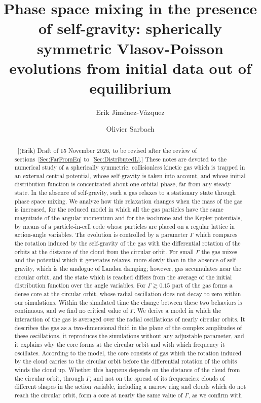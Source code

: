 \documentclass[prd,aps,showpacs,nofootinbib,superscriptaddress,amsmath,amssymb]{revtex4}
\newcommand{\EJ}[1]{{\color{red}~\textsf{[(Erik) #1]}}}
\begin{document}


\title{Phase space mixing in the presence of self-gravity: spherically symmetric Vlasov-Poisson evolutions from initial data out of equilibrium}

\author{Erik Jim\'enez-V\'azquez}
\affiliation{\EJ{Affiliation to be completed.}}

\author{Olivier Sarbach}


\begin{abstract}
\EJ{Draft of 15 November 2026, to be revised after the review of sections~\ref{Sec:FarFromEq} to~\ref{Sec:DistributedL}.}
These notes are devoted to the numerical study of a spherically symmetric, collisionless kinetic gas which is trapped in an external central potential, whose self-gravity is taken into account, and whose initial distribution function is concentrated about one orbital phase, far from any steady state. In the absence of self-gravity, such a gas relaxes to a stationary state through phase space mixing. We analyze how this relaxation changes when the mass of the gas is increased, for the reduced model in which all the gas particles have the same magnitude of the angular momentum and for the isochrone and the Kepler potentials, by means of a particle-in-cell code whose particles are placed on a regular lattice in action-angle variables. The evolution is controlled by a parameter $\Gamma$ which compares the rotation induced by the self-gravity of the gas with the differential rotation of the orbits at the distance of the cloud from the circular orbit. For small $\Gamma$ the gas mixes and the potential which it generates relaxes, more slowly than in the absence of self-gravity, which is the analogue of Landau damping; however, gas accumulates near the circular orbit, and the state which is reached differs from the average of the initial distribution function over the angle variables. For $\Gamma\gtrsim 0.15$ part of the gas forms a dense core at the circular orbit, whose radial oscillation does not decay to zero within our simulations. Within the simulated time the change between these two behaviors is continuous, and we find no critical value of $\Gamma$. We derive a model in which the interaction of the gas is averaged over the radial oscillations of nearly circular orbits. It describes the gas as a two-dimensional fluid in the plane of the complex amplitudes of these oscillations, it reproduces the simulations without any adjustable parameter, and it explains why the core forms at the circular orbit and with which frequency it oscillates. According to the model, the core consists of gas which the rotation induced by the cloud carries to the circular orbit before the differential rotation of the orbits winds the cloud up. Whether this happens depends on the distance of the cloud from the circular orbit, through $\Gamma$, and not on the spread of its frequencies: clouds of different shapes in the action variable, including a narrow ring and clouds which do not reach the circular orbit, form a core at nearly the same value of $\Gamma$, as we confirm with 
\end{abstract}
\end{document}
